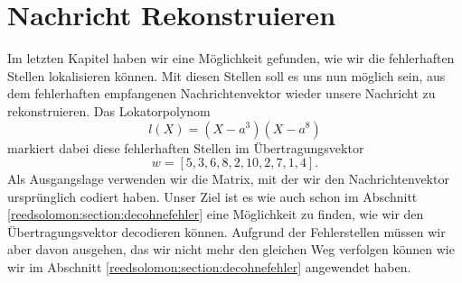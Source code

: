 %
%
%
\section{Nachricht Rekonstruieren
\label{reedsolomon:section:rekonstruktion}}
Im letzten Kapitel haben wir eine Möglichkeit gefunden, wie wir die fehlerhaften Stellen lokalisieren können.
Mit diesen Stellen soll es uns nun möglich sein, aus dem fehlerhaften empfangenen Nachrichtenvektor wieder unsere Nachricht zu rekonstruieren.
Das Lokatorpolynom
\[
l(X) = (X - a^3)(X-a^8)
\]
markiert dabei diese fehlerhaften Stellen im Übertragungsvektor
\[
w = [5,3,6,8,2,10,2,7,1,4].
\]
Als Ausgangslage verwenden wir die Matrix, mit der wir den Nachrichtenvektor ursprünglich codiert haben.
Unser Ziel ist es wie auch schon im Abschnitt \ref{reedsolomon:section:decohnefehler} eine Möglichkeit zu finden, wie wir den Übertragungsvektor decodieren können. 
Aufgrund der Fehlerstellen müssen wir aber davon ausgehen, das wir nicht mehr den gleichen Weg verfolgen können wie wir im Abschnitt \ref{reedsolomon:section:decohnefehler} angewendet haben.

